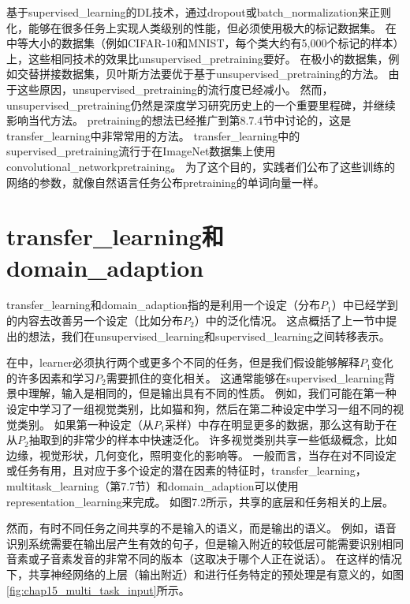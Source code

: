 基于\gls{supervised_learning}的\gls{DL}技术，通过\gls{dropout}或\gls{batch_normalization}来正则化，能够在很多任务上实现人类级别的性能，但必须使用极大的标记数据集。
在中等大小的数据集（例如CIFAR-10和MNIST，每个类大约有5,000个标记的样本）上，这些相同技术的效果比\gls{unsupervised_pretraining}要好。
在极小的数据集，例如交替拼接数据集，贝叶斯方法要优于基于\gls{unsupervised_pretraining}的方法\citep{Srivastava-master-small}。
由于这些原因，\gls{unsupervised_pretraining}的流行度已经减小。
然而，\gls{unsupervised_pretraining}仍然是深度学习研究历史上的一个重要里程碑，并继续影响当代方法。
\gls{pretraining}的想法已经推广到第8.7.4节中讨论的，这是\gls{transfer_learning}中非常常用的方法。
\gls{transfer_learning}中的\gls{supervised_pretraining}流行\citep{Oquab-et-al-CVPR2014,yosinski-nips2014}于在ImageNet数据集上使用\gls{convolutional_network}\gls{pretraining}。
为了这个目的，实践者们公布了这些训练的网络的参数，就像自然语言任务公布\gls{pretraining}的单词向量一样\citep{collobert2011natural,Mikolov-et-al-ICLR2013}。


\section{\gls{transfer_learning}和\gls{domain_adaption}}
\label{sec:transfer_learning_and_domain_adaptation}
\gls{transfer_learning}和\gls{domain_adaption}指的是利用一个设定（分布$P_1$）中已经学到的内容去改善另一个设定（比如分布$P_2$）中的泛化情况。
这点概括了上一节中提出的想法，我们在\gls{unsupervised_learning}和\gls{supervised_learning}之间转移表示。


在中，\gls{learner}必须执行两个或更多个不同的任务，但是我们假设能够解释$P_1$变化的许多因素和学习$P_2$需要抓住的变化相关。
这通常能够在\gls{supervised_learning}背景中理解，输入是相同的，但是输出具有不同的性质。
例如，我们可能在第一种设定中学习了一组视觉类别，比如猫和狗，然后在第二种设定中学习一组不同的视觉类别。
如果第一种设定（从$P_1$采样）中存在明显更多的数据，那么这有助于在从$P_2$抽取到的非常少的样本中快速泛化。
许多视觉类别共享一些低级概念，比如边缘，视觉形状，几何变化，照明变化的影响等。
一般而言，当存在对不同设定或任务有用，且对应于多个设定的潜在因素的特征时，\gls{transfer_learning}，\gls{multitask_learning}（第7.7节）和\gls{domain_adaption}可以使用\gls{representation_learning}来完成。
如图7.2所示，共享的底层和任务相关的上层。


然而，有时不同任务之间共享的不是输入的语义，而是输出的语义。
例如，语音识别系统需要在输出层产生有效的句子，但是输入附近的较低层可能需要识别相同音素或子音素发音的非常不同的版本（这取决于哪个人正在说话）。
在这样的情况下，共享神经网络的上层（输出附近）和进行任务特定的预处理是有意义的，如图\ref{fig:chap15_multi_task_input}所示。

